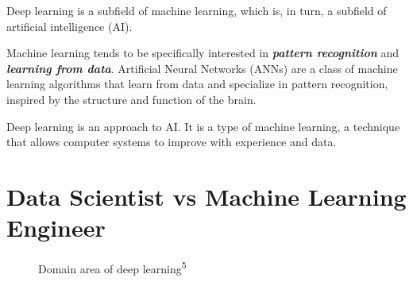 \documentclass[
  paper=6in:9in,
  pagesize=pdftex,
  headinclude=on,
  footinclude=on,
  12pt]{scrbook}
\begin{document}
\begin{tcolorbox}[enhanced jigsaw, colbacktitle=quarto-callout-tip-color!10!white, arc=.35mm, opacitybacktitle=0.6, titlerule=0mm, opacityback=0, bottomtitle=1mm, title=\textcolor{quarto-callout-tip-color}{\faLightbulb}\hspace{0.5em}{How do we relate it all?}, breakable, toptitle=1mm, colback=white, rightrule=.15mm, colframe=quarto-callout-tip-color-frame, left=2mm, bottomrule=.15mm, toprule=.15mm, leftrule=.75mm, coltitle=black]

Deep learning is a subfield of machine learning, which is, in turn, a
subfield of artificial intelligence (AI).

\end{tcolorbox}

Machine learning tends to be specifically interested in
\textbf{\emph{pattern recognition}} and \textbf{\emph{learning from
data}}. Artificial Neural Networks (ANNs) are a class of machine
learning algorithms that learn from data and specialize in pattern
recognition, inspired by the structure and function of the brain.

Deep learning is an approach to AI. It is a type of machine learning, a
technique that allows computer systems to improve with experience and
data.

\section{Data Scientist vs Machine Learning
Engineer}\label{data-scientist-vs-machine-learning-engineer}

\begin{figure}[H]


\caption{\label{fig-ml-kaitan}Domain area of deep
learning\textsuperscript{5}}

\end{figure}%
\end{document}
